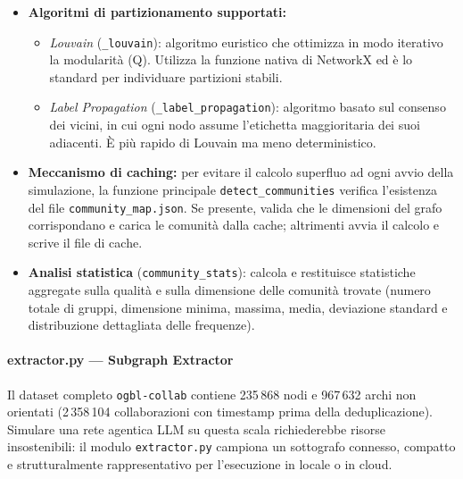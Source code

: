 \documentclass[11pt, a4paper]{article}
\begin{document}
\begin{itemize}[leftmargin=*]
    \item \textbf{Algoritmi di partizionamento supportati:}
    \begin{itemize}
        \item \textit{Louvain} (\texttt{\_louvain}): algoritmo euristico che ottimizza in modo iterativo la modularità (Q). Utilizza la funzione nativa di NetworkX ed è lo standard per individuare partizioni stabili.
        \item \textit{Label Propagation} (\texttt{\_label\_propagation}): algoritmo basato sul consenso dei vicini, in cui ogni nodo assume l'etichetta maggioritaria dei suoi adiacenti. È più rapido di Louvain ma meno deterministico.
    \end{itemize}
    \item \textbf{Meccanismo di caching:} per evitare il calcolo superfluo ad ogni avvio della simulazione, la funzione principale \texttt{detect\_communities} verifica l'esistenza del file \texttt{community\_map.json}. Se presente, valida che le dimensioni del grafo corrispondano e carica le comunità dalla cache; altrimenti avvia il calcolo e scrive il file di cache.
    \item \textbf{Analisi statistica} (\texttt{community\_stats}): calcola e restituisce statistiche aggregate sulla qualità e sulla dimensione delle comunità trovate (numero totale di gruppi, dimensione minima, massima, media, deviazione standard e distribuzione dettagliata delle frequenze).
\end{itemize}

\paragraph{extractor.py — Subgraph Extractor}
Il dataset completo \texttt{ogbl-collab} contiene 235\,868 nodi e 967\,632 archi non orientati (2\,358\,104 collaborazioni con timestamp prima della deduplicazione). Simulare una rete agentica LLM su questa scala richiederebbe risorse insostenibili: il modulo \texttt{extractor.py} campiona un sottografo connesso, compatto e strutturalmente rappresentativo per l'esecuzione in locale o in cloud.
\end{document}
